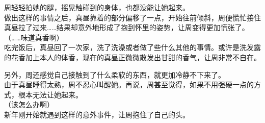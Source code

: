 周轻轻拍她的腿，摇晃触碰到的身体，也都没能让她起来。\\

做出这样的事情之后，真昼靠着的部分偏移了一点，开始往前倾斜，周便慌忙接住真昼拉了过来……结果却意外地形成了抱到怀里的姿势，让周变得更加慌张了。\\

（……味道真香啊）\\

吃完饭后，真昼回了一次家，洗了洗澡或者做了些什么其他的事情。或许是洗发露的花香加上本人的体香，现在的真昼正微微散发出甘甜的香气，让周非常不自在。

另外，周还感觉自己接触到了什么柔软的东西，就更加冷静不下来了。\\

由于真昼睡得太熟，周不忍心叫醒她。再说，周甚至觉得，如果不用强硬一点的方式，根本无法让她起来。\\

（该怎么办啊）\\

新年刚开始就遇到这样的意外事件，让周抱住了自己的头。

